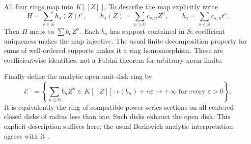 \documentclass[11pt,a4paper]{article}
\numberwithin{equation}{section}
\theoremstyle{definition}
\theoremstyle{remark}
\newcommand{\EE}{\mathcal E}
\begin{document}
All four rings map into $K[[Z]]$. To describe the map explicitly write
\[
 H=\sum_{s\in S}h_s(Z)t^s,\qquad
 h_s(Z)=\sum_{n\ge0}c_{s,n}Z^n,
 \qquad b_n=\sum_{s\in S}c_{s,n}t^s.
\]
Then $H$ maps to $\sum b_nZ^n$. Each $b_n$ has support contained in $S$;
coefficient uniqueness makes the map injective. The usual finite decomposition
property for sums of well-ordered supports makes it a ring homomorphism. These
are coefficientwise identities, not a Fubini theorem for arbitrary norm limits.

Finally define the analytic open-unit-disk ring by
\begin{equation}\label{eq:openring}
 \EE^-=
 \left\{\sum_{n\ge0}b_nZ^n\in K[[Z]]:
    v(b_n)+n\varepsilon\to+\infty\text{ for every }\varepsilon>0\right\}.
\end{equation}
It is equivalently the ring of compatible power-series sections on all centered
closed disks of radius less than one. Such disks exhaust the open disk. This
explicit description suffices here; the usual Berkovich analytic interpretation
agrees with it \cite[Section I.4]{PT}.
\end{document}
